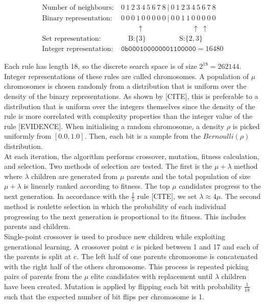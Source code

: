 \begin{equation} \label{eq:bs-calc}
\begin{split}
    \text{Number of neighbours:}&\ 0\ 1\ 2\ 3\ 4\ 5\ 6\ 7\ 8\ |\ 0\ 1\ 2\ 3\ 4\ 5\ 6\ 7\ 8\\
    \text{Binary representation:}&\ 0\ 0\ 0\ 1\ 0\ 0\ 0\ 0\ 0\ |\ 0\ 0\ 1\ 1\ 0\ 0\ 0\ 0\ 0\\
    &\qquad\ \: \uparrow \qquad \qquad \qquad \ \: \: \uparrow \ \uparrow\\
    \text{Set representation:}&\quad \ \text{B:} \{3\} \qquad \qquad \ \ \: \text{S:}\{2, 3\}\\
    \text{Integer representation:}&\ \texttt{0b000100000001100000} = 16480
\end{split}   
\end{equation}

Each rule has length 18, so the discrete search space is of size $2^{18} = 262144$. Integer representations of these rules are called chromosomes. A population of $\mu$ chromosomes is chosen randomly from a distribution that is uniform over the density of the binary representations. As shown by [CITE], this is preferable to a distribution that is uniform over the integers themselves since the density of the rule is more correlated with complexity properties than the integer value of the rule [EVIDENCE]. When initialising a random chromosome, a density $\rho$ is picked uniformly from $[0.0, 1.0]$. Then, each bit is a sample from the $\mathit{Bernoulli}(\rho)$ distribution.\\

At each iteration, the algorithm performs crossover, mutation, fitness calculation, and selection. Two methods of selection are tested. The first is the $\mu + \lambda$ method where $\lambda$ children are generated from $\mu$ parents and the total population of size $\mu + \lambda$ is linearly ranked according to fitness. The top $\mu$ candidates progress to the next generation. In accordance with the $\frac{1}{5}$ rule [CITE], we set $\lambda \approx 4\mu$. The second method is roulette selection in which the probability of each individual progressing to the next generation is proportional to its fitness. This includes parents and children.\\

Single-point crossover is used to produce new children while exploiting generational learning. A crossover point c is picked between 1 and 17 and each of the parents is split at c. The left half of one parents chromosome is concatenated with the right half of the others chromosome. This process is repeated picking pairs of parents from the $\mu$ elite candidates with replacement until $\lambda$ children have been created. Mutation is applied by flipping each bit with probability $\frac{1}{18}$ such that the expected number of bit flips per chromosome is 1.\\


